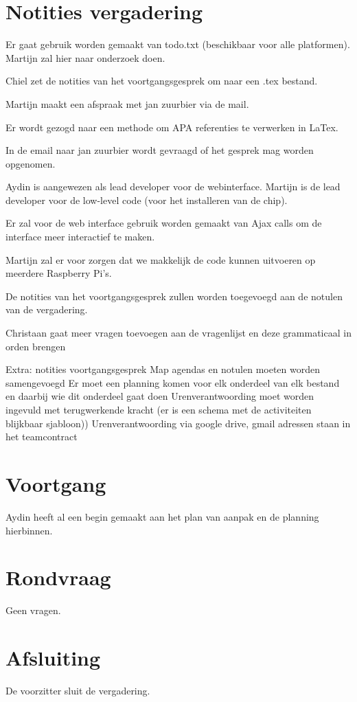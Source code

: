 \documentclass[dutch]{hu}
\begin{document}
\section{Notities vergadering}
Er gaat gebruik worden gemaakt van todo.txt (beschikbaar voor alle platformen). Martijn zal hier naar onderzoek doen.

Chiel zet de notities van het voortgangsgesprek om naar een .tex bestand.

Martijn maakt een afspraak met jan zuurbier via de mail.

Er wordt gezogd naar een methode om APA referenties te verwerken in LaTex.

In de email naar jan zuurbier wordt gevraagd of het gesprek mag worden opgenomen.

Aydin is aangewezen als lead developer voor de webinterface.
Martijn is de lead developer voor de low-level code (voor het installeren van de chip).

Er zal voor de web interface gebruik worden gemaakt van Ajax calls om de interface meer interactief te maken.

Martijn zal er voor zorgen dat we makkelijk de code kunnen uitvoeren op meerdere Raspberry Pi's.

De notities van het voortgangsgesprek zullen worden toegevoegd aan de notulen van de vergadering.

Christaan gaat meer vragen toevoegen aan de vragenlijst en deze grammaticaal in orden brengen

Extra: notities voortgangsgesprek
Map agendas en notulen moeten worden samengevoegd
Er moet een planning komen voor elk onderdeel van elk bestand en daarbij wie dit onderdeel gaat doen
Urenverantwoording moet worden ingevuld met terugwerkende kracht (er is een schema met de activiteiten blijkbaar sjabloon))
Urenverantwoording via google drive, gmail adressen staan in het teamcontract

\newpage
\section{Voortgang}
Aydin heeft al een begin gemaakt aan het plan van aanpak en de planning hierbinnen.

\section{Rondvraag}
Geen vragen.

\section{Afsluiting}
De voorzitter sluit de vergadering.
\end{document}

